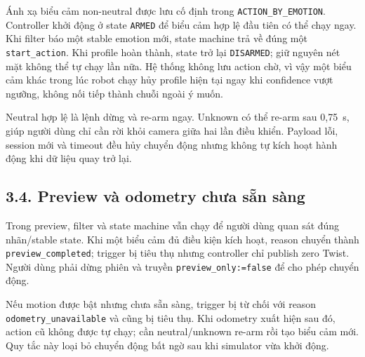 Ánh xạ biểu cảm non-neutral được lưu cố định trong
\texttt{ACTION\_BY\_EMOTION}. Controller khởi động ở state \texttt{ARMED} để
biểu cảm hợp lệ đầu tiên có thể chạy ngay. Khi filter báo một stable emotion
mới, state machine trả về đúng một \texttt{start\_action}. Khi
profile hoàn thành, state trở lại \texttt{DISARMED}; giữ nguyên nét mặt không
thể tự chạy lần nữa. Hệ thống không lưu action chờ, vì vậy một biểu cảm khác
trong lúc robot chạy hủy profile hiện tại ngay khi confidence vượt ngưỡng,
không nối tiếp thành chuỗi ngoài ý muốn.

Neutral hợp lệ là lệnh dừng và re-arm ngay. Unknown có thể re-arm sau 0,75~s,
giúp người dùng chỉ cần rời khỏi camera giữa hai lần điều khiển. Payload lỗi,
session mới và timeout đều hủy chuyển động nhưng không tự kích hoạt hành động
khi dữ liệu quay trở lại.

\subsection*{3.4. Preview và odometry chưa sẵn sàng}

Trong preview, filter và state machine vẫn chạy để người dùng quan sát đúng
nhãn/stable state. Khi một biểu cảm đủ điều kiện kích hoạt, reason chuyển thành
\texttt{preview\_completed}; trigger bị tiêu thụ nhưng controller chỉ publish
zero Twist. Người dùng phải dừng phiên và truyền
\texttt{preview\_only:=false} để cho phép chuyển động.

Nếu motion được bật nhưng  chưa sẵn sàng, trigger bị từ chối với
reason \texttt{odometry\_unavailable} và cũng bị tiêu thụ. Khi odometry xuất
hiện sau đó, action cũ không được tự chạy; cần neutral/unknown re-arm rồi tạo
biểu cảm mới. Quy tắc này loại bỏ chuyển động bất ngờ sau khi simulator vừa
khởi động.
